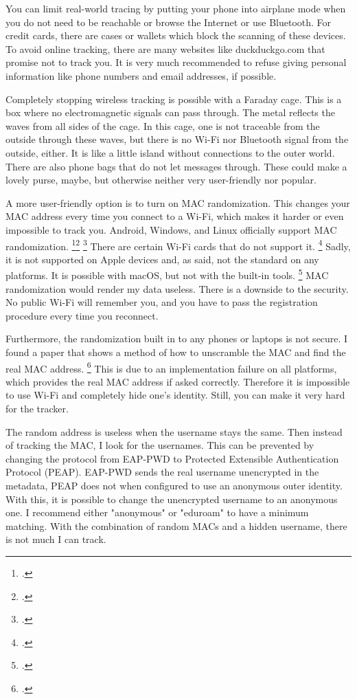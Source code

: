 \documentclass[paper=a4, fontsize=11pt]{article}
\begin{document}
You can limit real-world tracing by putting your phone into airplane mode when you do not need to be reachable or browse the Internet or use Bluetooth. For credit cards, there are cases or wallets which block the scanning of these devices. To avoid online tracking, there are many websites like duckduckgo.com that promise not to track you. It is very much recommended to refuse giving personal information like phone numbers and email addresses, if possible.

Completely stopping wireless tracking is possible with a Faraday cage. This is a box where no electromagnetic signals can pass through. The metal reflects the waves from all sides of the cage. In this cage, one is not traceable from the outside through these waves, but there is no Wi-Fi nor Bluetooth signal from the outside, either. It is like a little island without connections to the outer world. There are also phone bags that do not let messages through. These could make a lovely purse, maybe, but otherwise neither very user-friendly nor popular.

A more user-friendly option is to turn on MAC randomization. This changes your MAC address every time you connect to a Wi-Fi, which makes it harder or even impossible to track you. Android, Windows, and Linux officially support MAC randomization. \footcite{randomwindows}\footcite{randomandroid} \footcite{randomlinux} There are certain Wi-Fi cards that do not support it. \footcite{randomwin10} Sadly, it is not supported on Apple devices and, as said, not the standard on any platforms. It is possible with macOS, but not with the built-in tools. \footcite{randomapple} MAC randomization would render my data useless. There is a downside to the security. No public Wi-Fi will remember you, and you have to pass the registration procedure every time you reconnect.

Furthermore, the randomization built in to any phones or laptops is not secure. I found a paper that shows a method of how to unscramble the MAC and find the real MAC address. \footcite{notrandom}
This is due to an implementation failure on all platforms, which provides the real MAC address if asked correctly. Therefore it is impossible to use Wi-Fi and completely hide one's identity. Still, you can make it very hard for the tracker.

The random address is useless when the username stays the same. Then instead of tracking the MAC, I look for the usernames. This can be prevented by changing the protocol from EAP-PWD to Protected Extensible Authentication Protocol (PEAP). EAP-PWD sends the real username unencrypted in the metadata, PEAP does not  when configured to use an anonymous outer identity. With this, it is possible to change the unencrypted username to an anonymous one. I recommend either "anonymous" or "eduroam" to have a minimum matching. With the combination of random MACs and a hidden username, there is not much I can track.
\end{document}
